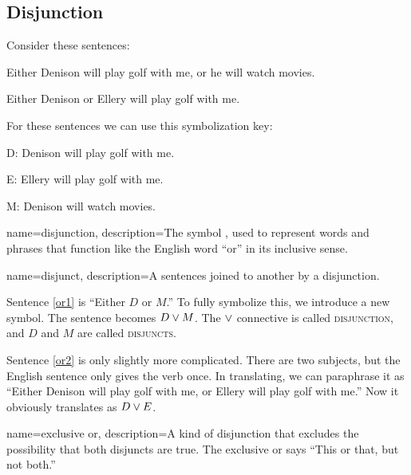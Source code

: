 
\subsection{Disjunction}
Consider these sentences:
\begin{earg}
\item[\ex{or1}]Either Denison will play golf with me, or he will watch movies.
\item[\ex{or2}]Either Denison or Ellery will play golf with me. 
\end{earg}

For these sentences we can use this symbolization key:

\begin{ekey}
\item[D:] Denison will play golf with me.
\item[E:] Ellery will play golf with me.
\item[M:] Denison will watch movies.
\end{ekey}

{
name=disjunction,
description={The symbol \eor, used to represent words and phrases that function like the English word ``or'' in its inclusive sense.}
}

{
name=disjunct,
description={A sentences joined to another by a disjunction.}
}



Sentence \ref{or1} is ``Either $D$ or $M$.'' To fully symbolize this, we introduce a new symbol. The sentence becomes $D \vee M$. The $\vee$ connective is called \textsc{\gls{disjunction}}, \label{def:disjunction} and $D$ and $M$ are called \textsc{\glspl{disjunct}}. \label{def:disjunct}

Sentence \ref{or2} is only slightly more complicated. There are two subjects, but the English sentence only gives the verb once. In translating, we can paraphrase it as ``Either Denison will play golf with me, or Ellery will play golf with me.'' Now it obviously translates as $D \vee E$.




{
name=exclusive or,
description={A kind of disjunction that excludes the possibility that both disjuncts are true. The exclusive or says ``This or that, but not both.''}
}


